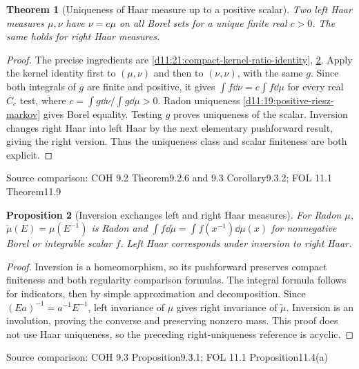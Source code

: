 \documentclass[11pt,oneside,openany]{book}
\newtheorem{theorem}{Theorem}[chapter]
\newtheorem{proposition}[theorem]{Proposition}
\theoremstyle{definition}
\theoremstyle{remark}
\newcommand{\family}[1]{}
\newcommand{\source}[1]{\par\begingroup\small\sffamily\color{black!65}Source comparison: #1\par\endgroup}
\begin{document}
\begin{theorem}[Uniqueness of Haar measure up to a positive scalar]\family{D11.21.haar_uniqueness}\label{d11:21:haar-uniqueness}
Two left Haar measures $\mu,\nu$ have $\nu=c\mu$ on all Borel sets for a unique finite real $c>0$. The same holds for right Haar measures.
\end{theorem}
\begin{proof}
The precise ingredients are \cref{d11:21:compact-kernel-ratio-identity}, \cref{d11:21:haar-inversion}. Apply the kernel identity first to $(\mu,\nu)$ and then to $(\nu,\nu)$, with the same $g$. Since both integrals of $g$ are finite and positive, it gives $\int f\dd\nu=c\int f\dd\mu$ for every real $C_c$ test, where $c=\int g\dd\nu/\int g\dd\mu>0$. Radon uniqueness \cref{d11:19:positive-riesz-markov} gives Borel equality. Testing $g$ proves uniqueness of the scalar. Inversion changes right Haar into left Haar by the next elementary pushforward result, giving the right version. Thus the uniqueness class and scalar finiteness are both explicit.
\end{proof}
\source{COH 9.2 Theorem9.2.6 and 9.3 Corollary9.3.2; FOL 11.1 Theorem11.9}

\begin{proposition}[Inversion exchanges left and right Haar measures]\family{D11.21.haar_inversion}\label{d11:21:haar-inversion}
For Radon $\mu$, $\check\mu(E)=\mu(E^{-1})$ is Radon and
$\int f\dd\check\mu=\int f(x^{-1})\dd\mu(x)$ for nonnegative Borel or integrable scalar $f$. Left Haar corresponds under inversion to right Haar.
\end{proposition}
\begin{proof}
Inversion is a homeomorphism, so its pushforward preserves compact finiteness and both regularity comparison formulas. The integral formula follows for indicators, then by simple approximation and decomposition. Since $(Ea)^{-1}=a^{-1}E^{-1}$, left invariance of $\mu$ gives right invariance of $\check\mu$. Inversion is an involution, proving the converse and preserving nonzero mass. This proof does not use Haar uniqueness, so the preceding right-uniqueness reference is acyclic.
\end{proof}
\source{COH 9.3 Proposition9.3.1; FOL 11.1 Proposition11.4(a)}
\end{document}
